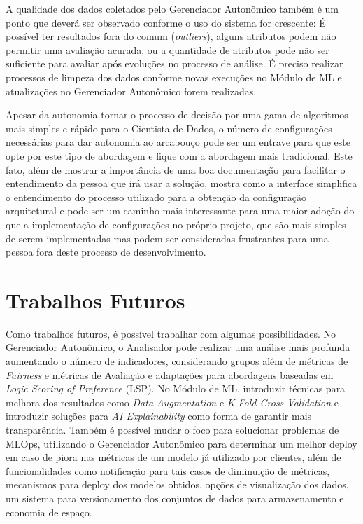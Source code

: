 \documentclass[portugues]{ic-tese}
\begin{document}
A qualidade dos dados coletados pelo Gerenciador Autonômico também é um ponto que deverá ser observado conforme o uso do sistema for crescente: É possível ter resultados fora do comum (\textit{outliers}), alguns atributos podem não permitir uma avaliação acurada, ou a quantidade de atributos pode não ser suficiente para avaliar após evoluções no processo de análise. É preciso realizar processos de limpeza dos dados conforme novas execuções no Módulo de ML e atualizações no Gerenciador Autonômico forem realizadas.

Apesar da autonomia tornar o processo de decisão por uma gama de algoritmos mais simples e rápido para o Cientista de Dados, o número de configurações necessárias para dar autonomia ao arcabouço pode ser um entrave para que este opte por este tipo de abordagem e fique com a abordagem mais tradicional. Este fato, além de mostrar a importância de uma boa documentação para facilitar o entendimento da pessoa que irá usar a solução, mostra como a interface simplifica o entendimento do processo utilizado para a obtenção da configuração arquitetural e pode ser um caminho mais interessante para uma maior adoção do que a implementação de configurações no próprio projeto, que são mais simples de serem implementadas mas podem ser consideradas frustrantes para uma pessoa fora deste processo de desenvolvimento. 

\section{Trabalhos Futuros}

Como trabalhos futuros, é possível trabalhar com algumas possibilidades. No Gerenciador Autonômico, o Analisador pode realizar uma análise mais profunda aumentando o número de indicadores, considerando grupos além de métricas de \textit{Fairness} e métricas de Avaliação e adaptações para abordagens baseadas em \textit{Logic Scoring of Preference} (LSP). No Módulo de ML, introduzir técnicas para melhora dos resultados como \textit{Data Augmentation} e \textit{K-Fold Cross-Validation} e introduzir soluções para \textit{AI Explainability} como forma de garantir mais transparência. Também é possível mudar o foco para solucionar problemas de MLOps, utilizando o Gerenciador Autonômico para determinar um melhor deploy em caso de piora nas métricas de um modelo já utilizado por clientes, além de funcionalidades como notificação para tais casos de diminuição de métricas, mecanismos para deploy dos modelos obtidos, opções de visualização dos dados, um sistema para versionamento dos conjuntos de dados para armazenamento e economia de espaço.
\end{document}
